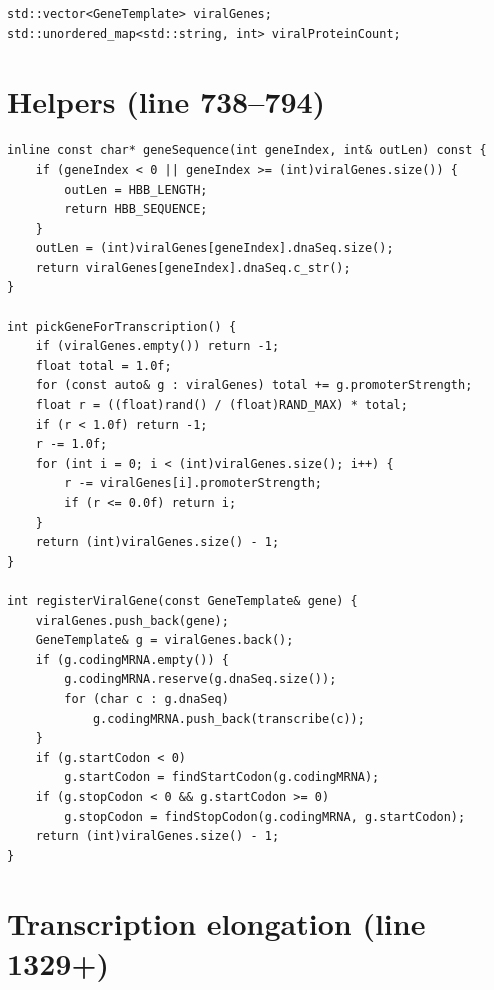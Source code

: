 \documentclass[11pt,letterpaper,twoside,openany]{book}
\begin{document}
\begin{lstlisting}
std::vector<GeneTemplate> viralGenes;
std::unordered_map<std::string, int> viralProteinCount;
\end{lstlisting}

\section{Helpers (line 738--794)}

\begin{lstlisting}
inline const char* geneSequence(int geneIndex, int& outLen) const {
    if (geneIndex < 0 || geneIndex >= (int)viralGenes.size()) {
        outLen = HBB_LENGTH;
        return HBB_SEQUENCE;
    }
    outLen = (int)viralGenes[geneIndex].dnaSeq.size();
    return viralGenes[geneIndex].dnaSeq.c_str();
}

int pickGeneForTranscription() {
    if (viralGenes.empty()) return -1;
    float total = 1.0f;
    for (const auto& g : viralGenes) total += g.promoterStrength;
    float r = ((float)rand() / (float)RAND_MAX) * total;
    if (r < 1.0f) return -1;
    r -= 1.0f;
    for (int i = 0; i < (int)viralGenes.size(); i++) {
        r -= viralGenes[i].promoterStrength;
        if (r <= 0.0f) return i;
    }
    return (int)viralGenes.size() - 1;
}

int registerViralGene(const GeneTemplate& gene) {
    viralGenes.push_back(gene);
    GeneTemplate& g = viralGenes.back();
    if (g.codingMRNA.empty()) {
        g.codingMRNA.reserve(g.dnaSeq.size());
        for (char c : g.dnaSeq)
            g.codingMRNA.push_back(transcribe(c));
    }
    if (g.startCodon < 0)
        g.startCodon = findStartCodon(g.codingMRNA);
    if (g.stopCodon < 0 && g.startCodon >= 0)
        g.stopCodon = findStopCodon(g.codingMRNA, g.startCodon);
    return (int)viralGenes.size() - 1;
}
\end{lstlisting}

\section{Transcription elongation (line 1329+)}
\end{document}
